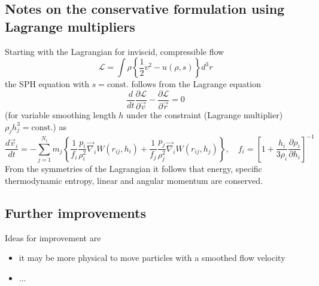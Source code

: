 
\subsection{Notes on the conservative formulation using Lagrange multipliers}
Starting with the Lagrangian for inviscid, compressible flow
\begin{equation}
    \mathcal{L}=\int \rho\left\{\frac{1}{2} v^2-u(\rho, s)\right\} d^3 r
\end{equation}
the SPH equation with $s = \text{const.}$ follows from the Lagrange equation
\begin{equation}
    \frac{d}{d t} \frac{\partial \mathcal{L}}{\partial \vec{v}}-\frac{\partial \mathcal{L}}{\partial \vec{r}}=0
\end{equation}
(for variable smoothing length $h$ under the constraint (Lagrange multiplier) $\rho_j h_j^3 = \text{const.}$) as
\begin{equation}
    \frac{d \vec{v}_i}{d t}=-\sum_{j=1}^{N_i} m_j\left\{\frac{1}{f_i} \frac{p_i}{\rho_i^2} \vec{\nabla}_i W\left(r_{i j}, h_i\right)+\frac{1}{f_j} \frac{p_j}{\rho_j^2} \vec{\nabla}_i W\left(r_{i j}, h_j\right)\right\}, \quad f_i=\left[1+\frac{h_i}{3 \rho_i} \frac{\partial \rho_i}{\partial h_i}\right]^{-1}
\end{equation}
From the symmetries of the Lagrangian it follows that energy, specific thermodynamic entropy, linear and angular momentum are conserved.

\subsection{Further improvements}
Ideas for improvement are
\begin{itemize}
    \item it may be more physical to move particles with a smoothed flow velocity
    \item ...
\end{itemize}

